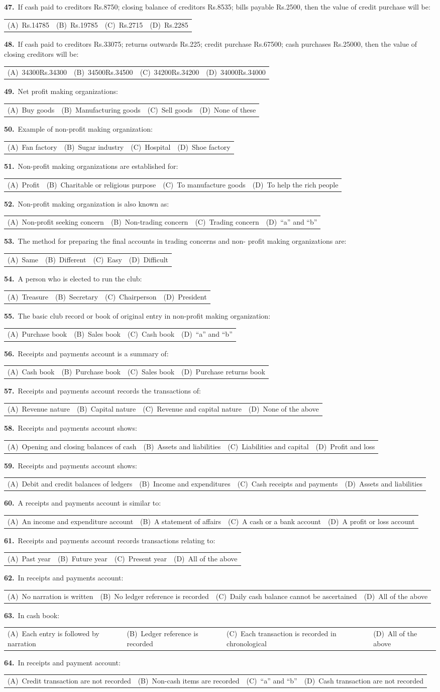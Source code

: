 \documentclass[11pt,a4paper]{article}
\makeatletter
\newcommand{\mcq}[6]{%
  \Needspace{4\baselineskip}%
  \par\medskip\noindent\textbf{#1.}\ #2\par\nopagebreak
  \noindent\begin{tabularx}{\linewidth}{@{\hspace{1.5em}}*{4}{>{\raggedright\arraybackslash}X}@{}}
    (A)~#3 & (B)~#4 & (C)~#5 & (D)~#6
  \end{tabularx}\par}
\makeatother
\begin{document}
\mcq{47}{If cash paid to creditors Rs.8750; closing balance of creditors Rs.8535; bills payable Rs.2500, then the value of credit purchase will be:}{Rs.14785}{Rs.19785}{Rs.2715}{Rs.2285}
\mcq{48}{If cash paid to creditors Rs.33075; returns outwards Rs.225; credit purchase Rs.67500; cash purchases Rs.25000, then the value of closing creditors will be:}{34300Rs.34300}{34500Rs.34500}{34200Rs.34200}{34000Rs.34000}
\mcq{49}{Net profit making organizations:}{Buy goods}{Manufacturing goods}{Sell goods}{None of these}
\mcq{50}{Example of non-profit making organization:}{Fan factory}{Sugar industry}{Hospital}{Shoe factory}
\mcq{51}{Non-profit making organizations are established for:}{Profit}{Charitable or religious purpose}{To manufacture goods}{To help the rich people}
\mcq{52}{Non-profit making organization is also known as:}{Non-profit seeking concern}{Non-trading concern}{Trading concern}{“a” and “b”}
\mcq{53}{The method for preparing the final accounts in trading concerns and non- profit making organizations are:}{Same}{Different}{Easy}{Difficult}
\mcq{54}{A person who is elected to run the club:}{Treasure}{Secretary}{Chairperson}{President}
\mcq{55}{The basic club record or book of original entry in non-profit making organization:}{Purchase book}{Sales book}{Cash book}{“a” and “b”}
\mcq{56}{Receipts and payments account is a summary of:}{Cash book}{Purchase book}{Sales book}{Purchase returns book}
\mcq{57}{Receipts and payments account records the transactions of:}{Revenue nature}{Capital nature}{Revenue and capital nature}{None of the above}
\mcq{58}{Receipts and payments account shows:}{Opening and closing balances of cash}{Assets and liabilities}{Liabilities and capital}{Profit and loss}
\mcq{59}{Receipts and payments account shows:}{Debit and credit balances of ledgers}{Income and expenditures}{Cash receipts and payments}{Assets and liabilities}
\mcq{60}{A receipts and payments account is similar to:}{An income and expenditure account}{A statement of affairs}{A cash or a bank account}{A profit or loss account}
\mcq{61}{Receipts and payments account records transactions relating to:}{Past year}{Future year}{Present year}{All of the above}
\mcq{62}{In receipts and payments account:}{No narration is written}{No ledger reference is recorded}{Daily cash balance cannot be ascertained}{All of the above}
\mcq{63}{In cash book:}{Each entry is followed by narration}{Ledger reference is recorded}{Each transaction is recorded in chronological}{All of the above}
\mcq{64}{In receipts and payment account:}{Credit transaction are not recorded}{Non-cash items are recorded}{“a” and “b”}{Cash transaction are not recorded}
\end{document}
